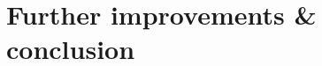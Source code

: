 \section{Further improvements \& conclusion}
\label{sec:other-solutions}







\pagebreak      %


\pagebreak
\appendix



